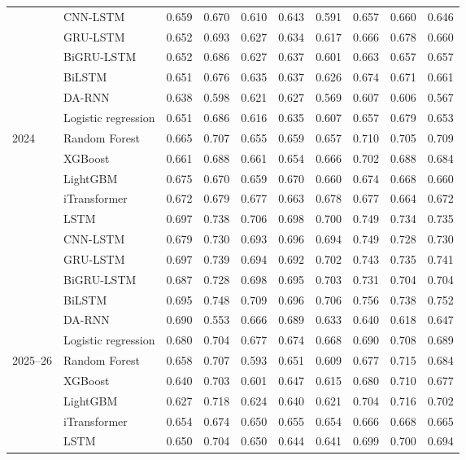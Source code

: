 \begin{footnotesize}
\begin{longtable}{@{} l l cccccccc @{}}
 & CNN-LSTM & 0.659 & 0.670 & 0.610 & 0.643 & 0.591 & 0.657 & 0.660 & 0.646 \\
 & GRU-LSTM & 0.652 & 0.693 & 0.627 & 0.634 & 0.617 & 0.666 & 0.678 & 0.660 \\
 & BiGRU-LSTM & 0.652 & 0.686 & 0.627 & 0.637 & 0.601 & 0.663 & 0.657 & 0.657 \\
 & BiLSTM & 0.651 & 0.676 & 0.635 & 0.637 & 0.626 & 0.674 & 0.671 & 0.661 \\
 & DA-RNN & 0.638 & 0.598 & 0.621 & 0.627 & 0.569 & 0.607 & 0.606 & 0.567 \\
 & Logistic regression & 0.651 & 0.686 & 0.616 & 0.635 & 0.607 & 0.657 & 0.679 & 0.653 \\
\midrule
2024 & Random Forest & 0.665 & 0.707 & 0.655 & 0.659 & 0.657 & 0.710 & 0.705 & 0.709 \\
 & XGBoost & 0.661 & 0.688 & 0.661 & 0.654 & 0.666 & 0.702 & 0.688 & 0.684 \\
 & LightGBM & 0.675 & 0.670 & 0.659 & 0.670 & 0.660 & 0.674 & 0.668 & 0.660 \\
 & iTransformer & 0.672 & 0.679 & 0.677 & 0.663 & 0.678 & 0.677 & 0.664 & 0.672 \\
 & LSTM & 0.697 & 0.738 & 0.706 & 0.698 & 0.700 & 0.749 & 0.734 & 0.735 \\
 & CNN-LSTM & 0.679 & 0.730 & 0.693 & 0.696 & 0.694 & 0.749 & 0.728 & 0.730 \\
 & GRU-LSTM & 0.697 & 0.739 & 0.694 & 0.692 & 0.702 & 0.743 & 0.735 & 0.741 \\
 & BiGRU-LSTM & 0.687 & 0.728 & 0.698 & 0.695 & 0.703 & 0.731 & 0.704 & 0.704 \\
 & BiLSTM & 0.695 & 0.748 & 0.709 & 0.696 & 0.706 & 0.756 & 0.738 & 0.752 \\
 & DA-RNN & 0.690 & 0.553 & 0.666 & 0.689 & 0.633 & 0.640 & 0.618 & 0.647 \\
 & Logistic regression & 0.680 & 0.704 & 0.677 & 0.674 & 0.668 & 0.690 & 0.708 & 0.689 \\
\midrule
2025--26 & Random Forest & 0.658 & 0.707 & 0.593 & 0.651 & 0.609 & 0.677 & 0.715 & 0.684 \\
 & XGBoost & 0.640 & 0.703 & 0.601 & 0.647 & 0.615 & 0.680 & 0.710 & 0.677 \\
 & LightGBM & 0.627 & 0.718 & 0.624 & 0.640 & 0.621 & 0.704 & 0.716 & 0.702 \\
 & iTransformer & 0.654 & 0.674 & 0.650 & 0.655 & 0.654 & 0.666 & 0.668 & 0.665 \\
 & LSTM & 0.650 & 0.704 & 0.650 & 0.644 & 0.641 & 0.699 & 0.700 & 0.694 \\

\end{longtable}
\end{footnotesize}
